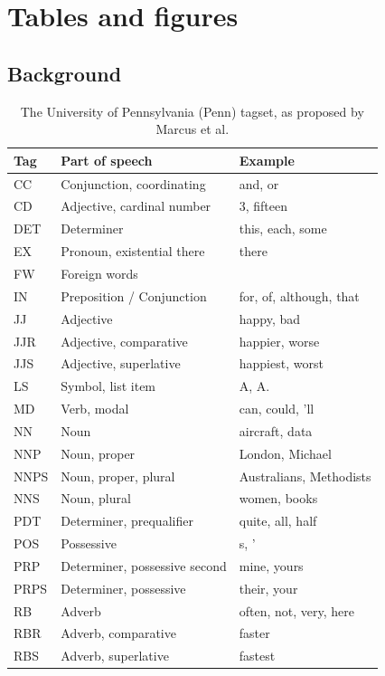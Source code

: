 \chapter{Tables and figures}

\section{Background}
\begin{center}
\begin{longtable}{ | l | l | l |}
	\caption{The University of Pennsylvania (Penn) tagset, as proposed by Marcus et al. \cite{Marcus:1993wd}} \label{table:penn} \\
	\hline
	Tag & Part of speech & Example \\
	\hline 
	CC & Conjunction, coordinating & and, or \\
  CD & Adjective, cardinal number & 3, fifteen \\
  DET & Determiner & this, each, some \\
  EX & Pronoun, existential there & there \\
  FW & Foreign words & \\
  IN & Preposition / Conjunction & for, of, although, that \\
  JJ & Adjective & happy, bad \\
  JJR & Adjective, comparative & happier, worse \\
  JJS & Adjective, superlative & happiest, worst \\
  LS & Symbol, list item & A, A. \\
  MD & Verb, modal & can, could, 'll \\
  NN & Noun & aircraft, data \\
  NNP & Noun, proper & London, Michael \\
  NNPS & Noun, proper, plural & Australians, Methodists \\
  NNS & Noun, plural & women, books \\
  PDT & Determiner, prequalifier & quite, all, half \\
  POS & Possessive & s, ' \\
  PRP & Determiner, possessive second & mine, yours \\
  PRPS & Determiner, possessive & their, your \\
  RB & Adverb & often, not, very, here \\
  RBR & Adverb, comparative & faster \\
  RBS & Adverb, superlative & fastest \\

\end{longtable}
\end{center}
